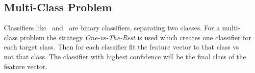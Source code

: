 \subsection{Multi-Class Problem}
Classifiers like \nb\ and \svm\ are binary classifiers, separating two classes. For a multi-class problem the strategy \emph{One-vs-The-Rest} is used which creates one classifier for each target class. Then for each classifier fit the feature vector to that class vs not that class. The classifier with highest confidence will be the final class of the feature vector.